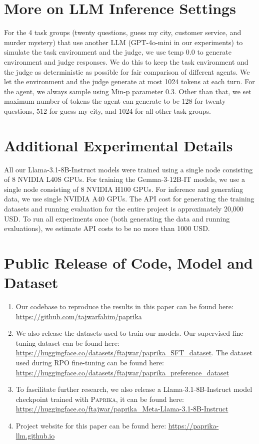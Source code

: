\documentclass{article}
\newcommand{\ours}[1]{\textsc{Paprika}}
\theoremstyle{plain}
\theoremstyle{definition}
\theoremstyle{remark}
\begin{document}
\section{More on LLM Inference Settings}
For the 4 task groups (twenty questions, guess my city, customer service, and murder mystery) that use another LLM (GPT-4o-mini in our experiments) to simulate the task environment and the judge, we use temp 0.0 to generate environment and judge responses. We do this to keep the task environment and the judge as deterministic as possible for fair comparison of different agents. We let the environment and the judge generate at most 1024 tokens at each turn.
For the agent, we always sample using Min-p parameter $0.3$. Other than that, we set maximum number of tokens the agent can generate to be  128 for twenty questions, 512 for guess my city, and 1024 for all other task groups.
\section{Additional Experimental Details}
All our Llama-3.1-8B-Instruct models were trained using a single node consisting of 8 NVIDIA L40S GPUs. For training the Gemma-3-12B-IT models, we use a single node consisting of 8 NVIDIA H100 GPUs. For inference and generating data, we use single NVIDIA A40 GPUs. The API cost for generating the training datasets and running evaluation for the entire project is approximately 20,000 USD. To run all experiments once (both generating the data and running evaluations), we estimate API costs to be no more than 1000 USD.
\section{Public Release of Code, Model and Dataset}
\begin{enumerate}
    \item Our codebase to reproduce the results in this paper can be found here: \url{https://github.com/tajwarfahim/paprika}
    \item We also release the datasets used to train our models. Our supervised fine-tuning dataset can be found here: \url{https://huggingface.co/datasets/ftajwar/paprika_SFT_dataset}. The dataset used during RPO fine-tuning can be found here: \url{https://huggingface.co/datasets/ftajwar/paprika_preference_dataset}
    \item To fascilitate further research, we also release a Llama-3.1-8B-Instruct model checkpoint trained with \ours{}, it can be found here: \url{https://huggingface.co/ftajwar/paprika_Meta-Llama-3.1-8B-Instruct}
    \item Project website for this paper can be found here: \url{https://paprika-llm.github.io}
\end{enumerate}
\newpage
\end{document}
